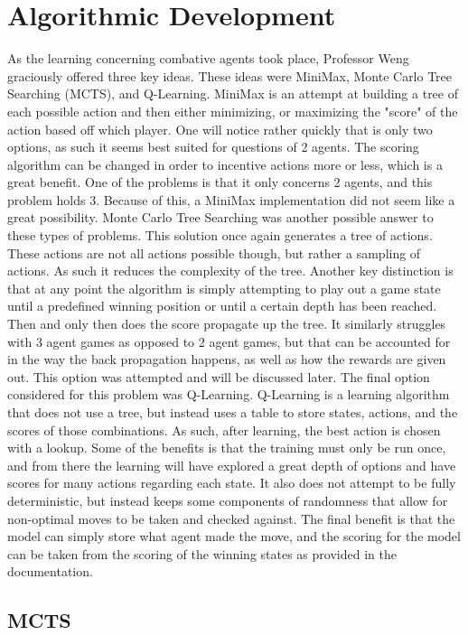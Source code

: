 \documentclass[letterpaper, 10 pt, conference]{ieeeconf}   %
\begin{document}
\section{Algorithmic Development}

As the learning concerning combative agents took place, Professor Weng graciously offered three key ideas. These ideas were MiniMax, Monte Carlo Tree Searching (MCTS), and
Q-Learning.
MiniMax is an attempt at building a tree of each possible action and then either minimizing, or maximizing the "score" of the action based off which player. One will notice
rather quickly that is only two options, as such it seems best suited for questions of 2 agents. The scoring algorithm can be changed in order to incentive actions
more or less, which is a great benefit. One of the problems is that it only concerns 2 agents, and this problem holds 3. Because of this, a MiniMax implementation did not seem
like a great possibility.
Monte Carlo Tree Searching was another possible answer to these types of problems. This solution once again generates a tree of actions. These
actions are not all actions possible though, but rather a sampling of actions. As such it reduces the complexity
of the tree. Another key distinction is that at any point the algorithm is simply attempting to play out a game state
until a predefined winning position or until a certain depth has been reached. Then and only then does the score propagate up the tree. It similarly struggles with
3 agent games as opposed to 2 agent games, but that can be accounted for in the way the back propagation happens, as well as how the rewards are given out.
This option was attempted and will be discussed later.
The final option considered for this problem was Q-Learning. Q-Learning is a learning algorithm that does not use a tree, but instead uses a table to store
states, actions, and the scores of those combinations. As such, after learning, the best action is chosen with a lookup. Some of the benefits is that
the training must only be run once, and from there the learning will have explored a great depth of options and have scores for many actions regarding each state.
It also does not attempt to be fully deterministic, but instead keeps some components of randomness that allow for non-optimal moves to be taken and checked against. The final
benefit is that the model can simply store what agent made the move, and the scoring for the model can be taken from the scoring of the winning states as provided in the documentation.
\subsection{MCTS}
\end{document}
